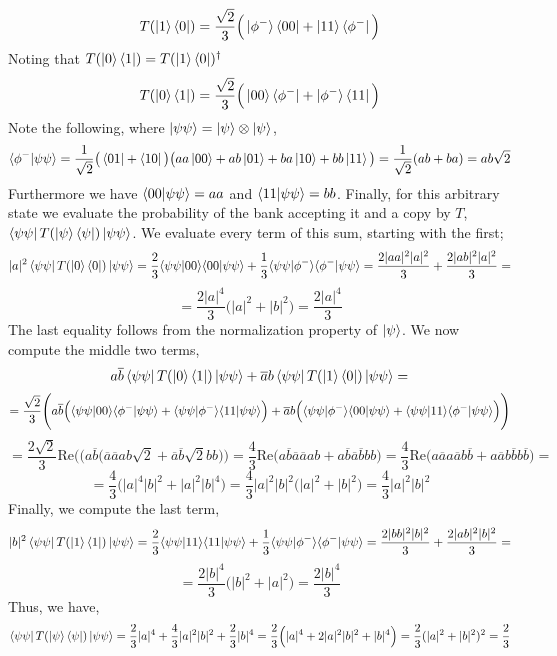 \documentclass[12pt]{article}
\begin{document}
\begin{enumerate}
\begin{enumerate}
$$T(\ket{1} \bra{0}) = 
\frac{\sqrt{2}}{3} \Big(\ket{\phi^-}
\bra{00} + \ket{11} \bra{\phi^-} \Big) $$
Noting that $T(\ket{0} \bra{1}) = T(\ket{1} \bra{0})^\dagger$
$$T(\ket{0} \bra{1}) = 
\frac{\sqrt{2}}{3} 
\Big(
\ket{00}\bra{\phi^-} + \ket{\phi^-} \bra{11} \Big)
$$
Note the following, where $\ket{\psi\psi} = \ket{\psi} \otimes \ket{\psi}$,
$$\langle \phi^- \vert \psi\psi\rangle = \frac{1}{\sqrt{2}}\big(\bra{01} + \bra{10}\big) \big(aa \ket{00} + ab \ket{01} + ba \ket{10} + bb \ket{11} \big) = \frac{1}{\sqrt{2}} (ab + ba) = ab\sqrt{2}$$
Furthermore we have $\langle 00 \vert \psi\psi\rangle = aa$ and $\langle 11 \vert \psi\psi\rangle = bb$.
Finally, for this arbitrary state we evaluate the probability of the bank accepting it and a copy by $T$, $\bra{\psi \psi} T(\ket{\psi} \bra{\psi}) \ket{\psi \psi}$. We evaluate every term of this sum, starting with the first;
$$ 
|a|^2 \bra{\psi \psi} T(\ket{0} \bra{0}) \ket{\psi \psi} = 
\frac{2}{3} \langle \psi \psi \vert 00\rangle\langle 00 \vert \psi \psi\rangle + \frac{1}{3}\langle \psi \psi \vert \phi^-\rangle\langle \phi^- \vert \psi \psi\rangle
= \frac{2|aa|^2|a|^2}{3} + \frac{2|ab|^2|a|^2}{3} =$$
$$ = \frac{2|a|^4}{3}\Big(|a|^2 + |b|^2 \Big) = \frac{2|a|^4}{3} $$
The last equality follows from the normalization property of $\ket{\psi}$. We now compute the middle two terms,
$$
a\overline{b} \bra{\psi \psi} T(\ket{0} \bra{1}) \ket{\psi \psi} + 
\overline{a}b \bra{\psi \psi} T(\ket{1} \bra{0}) \ket{\psi \psi} = $$
$$ = \frac{\sqrt{2}}{3} \Bigg(
a\overline{b} \Big(
\langle \psi \psi \vert 00\rangle\langle \phi^- \vert \psi \psi\rangle + \langle \psi \psi \vert \phi^-\rangle \langle 11 \vert \psi \psi\rangle \Big)
 + \overline{a}b \Big(
\langle \psi \psi \vert \phi^-\rangle
\langle 00 \vert \psi \psi\rangle + \langle \psi \psi \vert 11\rangle \langle \phi^- \vert \psi \psi\rangle \Big) \Bigg)
$$
$$ = \frac{2\sqrt{2}}{3} \text{Re} \Bigg(
\Big(a\overline{b} \Big(
\overline{a}\overline{a} ab\sqrt{2} + \overline{a}\overline{b}\sqrt{2} bb \Big) \Bigg) = \frac{4}{3}\text{Re}\Big( a\overline{b}\overline{a}\overline{a} ab + a\overline{b}\overline{a}\overline{b} bb \Big) = \frac{4}{3}\text{Re}\Big( a\overline{a}a\overline{a} b\overline{b} + a\overline{a}b\overline{b} b\overline{b} \Big) = 
$$
$$ = \frac{4}{3}\Big(|a|^4|b|^2 + |a|^2|b|^4\Big) = \frac{4}{3}|a|^2|b|^2\Big(|a|^2 + |b|^2\Big) = \frac{4}{3}|a|^2|b|^2$$
Finally, we compute the last term,
$$ 
|b|^2 \bra{\psi \psi} T(\ket{1} \bra{1}) \ket{\psi \psi} = 
\frac{2}{3} \langle \psi \psi \vert 11\rangle\langle 11 \vert \psi \psi\rangle + \frac{1}{3}\langle \psi \psi \vert \phi^-\rangle\langle \phi^- \vert \psi \psi\rangle
= \frac{2|bb|^2|b|^2}{3} + \frac{2|ab|^2|b|^2}{3} =$$
$$ = \frac{2|b|^4}{3}\Big(|b|^2 + |a|^2 \Big) = \frac{2|b|^4}{3} $$
Thus, we have,
$$\bra{\psi \psi} T(\ket{\psi} \bra{\psi}) \ket{\psi \psi} = \frac{2}{3}|a|^4 + \frac{4}{3}|a|^2|b|^2 + \frac{2}{3}|b|^4 = \frac{2}{3}\Big( |a|^4 + 2|a|^2|b|^2 + |b|^4 \Big) = \frac{2}{3} (|a|^2 + |b|^2)^2 = \frac{2}{3}$$

\end{enumerate}
\end{enumerate}
\end{document}
